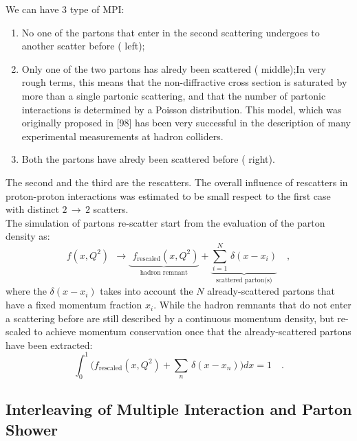 \noindent We can have 3 type of MPI:
\begin{enumerate}
	\item No one of the partons that enter in the second scattering undergoes to another scatter before ( left);
	\item Only one of the two partons has alredy been scattered ( middle);In very rough terms, this means that the non-diffractive
cross section is saturated by more than a single partonic scattering, and that the number of partonic
interactions is determined by a Poisson distribution. This model, which was originally proposed in [98]
has been very successful in the description of many experimental measurements at hadron colliders.
	\item Both the partons have alredy been scattered before ( right). 
\end{enumerate}
The second and the third are the rescatters. The overall influence of rescatters in proton-proton interactions was estimated to be small respect to the first case with distinct $2\,\rightarrow\,2$  scatters. 
\\
The simulation of partons re-scatter start from the evaluation of the parton density as:
\begin{equation}
	f(x,Q^2)\ \  \longrightarrow\! \underbrace{\phantom{\Bigg(} f_{\text{rescaled}}(x,Q^2)}_{\text{hadron remnant}}+\underbrace{\displaystyle\sum_{i=1}^N \,\delta(x-x_i)}_{\text{scattered parton(s)}}\quad,
\end{equation} 
where the $\delta(x-x_i)$ takes into account the $N$  already-scattered partons that have a fixed momentum fraction $x_i$. While the hadron remnants that do not enter a scattering before are still described by a continuous momentum density, but re-scaled to achieve momentum conservation once that the already-scattered partons have been extracted:
\begin{equation}	\displaystyle\int_0^1 \bigg( f_{\text{rescaled}}(x,Q^2) +\displaystyle\sum_n \,\delta(x-x_n) \bigg)dx=1\quad.
\end{equation}


\subsection{Interleaving of Multiple Interaction and Parton Shower}

